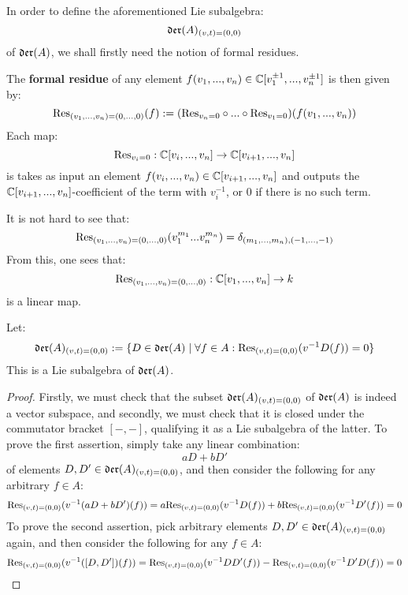         In order to define the aforementioned Lie subalgebra:
            $$\mathfrak{der}(A)_{(v, t) = (0, 0)}$$
        of $\mathfrak{der}(A)$, we shall firstly need the notion of formal residues. 
        \begin{definition} \label{def: formal_residues}
            The \textbf{formal residue} of any element $f(v_1, ..., v_n) \in \mathbb{C}[v_1^{\pm 1}, ..., v_n^{\pm 1}]$ is then given by:
                $$\mathrm{Res}_{(v_1, ..., v_n) = (0, ..., 0)}(f) := ( \mathrm{Res}_{v_n = 0} \circ ... \circ \mathrm{Res}_{v_1 = 0} )( f(v_1, ..., v_n) )$$
            Each map:
                $$\mathrm{Res}_{v_i = 0}: \mathbb{C}[v_i, ..., v_n] \to \mathbb{C}[v_{i + 1}, ..., v_n]$$
            is takes as input an element $f(v_i, ..., v_n) \in \mathbb{C}[v_{i + 1}, ..., v_n]$ and outputs the $\mathbb{C}[v_{i + 1}, ..., v_n]$-coefficient of the term with $v_i^{-1}$, or $0$ if there is no such term. 
        \end{definition}
        \begin{remark}
            It is not hard to see that:
                $$\mathrm{Res}_{(v_1, ..., v_n) = (0, ..., 0)}( v_1^{m_1} ... v_n^{m_n} ) = \delta_{(m_1, ..., m_n), (-1, ..., -1)}$$
            From this, one sees that:
                $$\mathrm{Res}_{(v_1, ..., v_n) = (0, ..., 0)}: \mathbb{C}[v_1, ..., v_n] \to k$$
            is a linear map.
        \end{remark}
        \begin{lemma} \label{lemma: yangian_div_zero_vector_fields}
            Let:
                $$\mathfrak{der}(A)_{(v, t) = (0, 0)} := \{ D \in \mathfrak{der}(A) \mid \forall f \in A: \mathrm{Res}_{(v, t) = (0, 0)}( v^{-1} D(f) ) = 0 \}$$
            This is a Lie subalgebra of $\mathfrak{der}(A)$.
        \end{lemma}
            \begin{proof}
                Firstly, we must check that the subset $\mathfrak{der}(A)_{(v, t) = (0, 0)}$ of $\mathfrak{der}(A)$ is indeed a vector subspace, and secondly, we must check that it is closed under the commutator bracket $[-, -]$, qualifying it as a Lie subalgebra of the latter. To prove the first assertion, simply take any linear combination:
                    $$a D + b D'$$
                of elements $D, D' \in \mathfrak{der}(A)_{(v, t) = (0, 0)}$, and then consider the following for any arbitrary $f \in A$:
                    $$\mathrm{Res}_{(v, t) = (0, 0)}( v^{-1} ( a D + b D' )(f) ) = a \mathrm{Res}_{(v, t) = (0, 0)}( v^{-1} D(f) ) + b\mathrm{Res}_{(v, t) = (0, 0)}( v^{-1} D'(f) ) = 0$$
                To prove the second assertion, pick arbitrary elements $D, D' \in \mathfrak{der}(A)_{(v, t) = (0, 0)}$ again, and then consider the following for any $f \in A$:
                    $$\mathrm{Res}_{(v, t) = (0, 0)}( v^{-1} ([D, D'])(f) ) = \mathrm{Res}_{(v, t) = (0, 0)}( v^{-1} DD'(f) ) - \mathrm{Res}_{(v, t) = (0, 0)}( v^{-1} D'D(f) ) = 0$$
            \end{proof}
